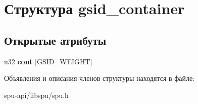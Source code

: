 \hypertarget{structgsid__container}{}\section{Структура gsid\+\_\+container}
\label{structgsid__container}
\subsection*{Открытые атрибуты}
\begin{DoxyCompactItemize}
\item 
\mbox{\label{structgsid__container_a59c431b036194c920a77dce89e025109}} 
u32 {\bfseries cont} \mbox{[}G\+S\+I\+D\+\_\+\+W\+E\+I\+G\+HT\mbox{]}
\end{DoxyCompactItemize}


Объявления и описания членов структуры находятся в файле\+:\begin{DoxyCompactItemize}
\item 
spu-\/api/libspu/spu.\+h\end{DoxyCompactItemize}
